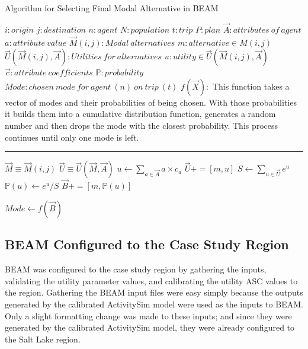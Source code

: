 \documentclass[12pt, oneside, openright]{byuthesis}
\begin{document}
\begin{algorithm}
\caption{Algorithm for Selecting Final Modal Alternative in BEAM}
\begin{algorithmic}[1]
\Require
\State $i : origin$
\State $j : destination$
\State $n: agent$
\State $N: population$
\State $t : trip $
\State $P : plan$
\State $\vec{A}: attributes\:of\:agent$
\State $a: attribute\:value$
\State $\vec{M}(i,j) : Modal\:alternatives$
\State $m : alternative \in M(i,j)$
\State $\vec{U}(\vec{M}(i,j),\vec{A}):Utilities\:for\:alternatives$
\State $u: utility \in \vec{U}(\vec{M}(i,j),\vec{A})$
\State $\vec{c}: attribute\:coefficients$
\State $\mathds{P}: probability$
\State $Mode: chosen\:mode\:for\:agent\:(n)\:on\:trip\:(t)$
\State $f(\vec{X}):$
This function takes a vector of modes and  their probabilities of being chosen. With those probabilities it builds them into a cumulative distribution function, generates a random number and then drops the mode with the closest probability. This process continues until only one mode is left.
\vspace{4pt}\hrule\vspace{5pt}

\State $\vec{M} \equiv \vec{M}(i,j)$
\State $\vec{U} \equiv \vec{U}(\vec{M},\vec{A})$
  \State $u \gets \sum_{a\in \vec{A}} a \times c_a$
  \State $\vec{U} += [m,u]$
\EndFor
\State $S \gets \sum_{u\in \vec{U}}e^u$
    \State $\mathds{P}(u)\gets e^u / S$
    \State $\vec{B} +=[m, \mathds{P}(u)]$
\EndFor 

\State $Mode \gets f(\vec{B})$

\EndProcedure

\EndFor
\EndFor
\Statex
\end{algorithmic}
\end{algorithm}

\hypertarget{beam-configured-to-the-case-study-region}{%
\subsection{BEAM Configured to the Case Study Region}\label{beam-configured-to-the-case-study-region}}

BEAM was configured to the case study region by gathering the inputs, validating the utility parameter values, and calibrating the utility ASC values to the region. Gathering the BEAM input files were easy simply because the outputs generated by the calibrated ActivitySim model were used as the inputs to BEAM. Only a slight formatting change was made to these inputs; and since they were generated by the calibrated ActivitySim model, they were already configured to the Salt Lake region.
\end{document}
